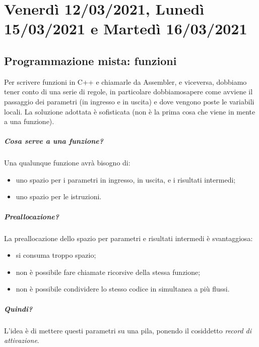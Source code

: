 \chapter{Venerdì 12/03/2021, Lunedì 15/03/2021 e Martedì 16/03/2021}

\section{Programmazione mista: funzioni}
Per scrivere funzioni in C++ e chiamarle da Assembler, e viceversa, dobbiamo tener conto di una serie di regole, in particolare dobbiamosapere come avviene il passaggio dei parametri (in ingresso e in uscita) e dove vengono poste le variabili locali. La soluzione adottata è sofisticata (non è la prima cosa che viene in mente a una funzione).

\paragraph{Cosa serve a una funzione?}
Una qualunque funzione avrà bisogno di:
\begin{itemize}
	\item uno spazio per i parametri in ingresso, in uscita, e i risultati intermedi;
	\item uno spazio per le istruzioni.
\end{itemize}
\paragraph{Preallocazione?} La preallocazione dello spazio per parametri e risultati intermedi è svantaggiosa: 
\begin{itemize}
	\item si consuma troppo spazio;
	\item non è possibile fare chiamate ricorsive della stessa funzione;
	\item non è possibile condividere lo stesso codice in simultanea a più flussi.
\end{itemize}

\paragraph{Quindi?} L'idea è di mettere questi parametri su una pila, ponendo il cosiddetto \emph{record di attivazione}.
\clearpage 
